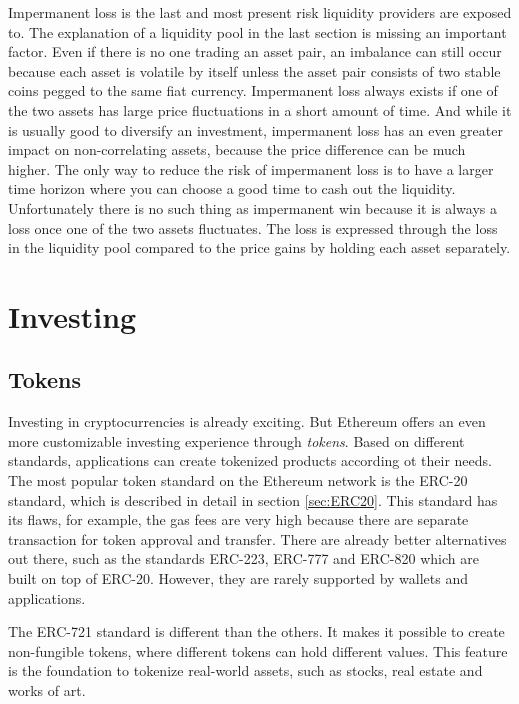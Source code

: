 Impermanent loss is the last and most present risk liquidity providers are exposed to. The explanation of a liquidity pool in the last section is missing an important factor. Even if there is no one trading an asset pair, an imbalance can still occur because each asset is volatile by itself unless the asset pair consists of two stable coins pegged to the same fiat currency. Impermanent loss always exists if one of the two assets has large price fluctuations in a short amount of time. And while it is usually good to diversify an investment, impermanent loss has an even greater impact on non-correlating assets, because the price difference can be much higher. The only way to reduce the risk of impermanent loss is to have a larger time horizon where you can choose a good time to cash out the liquidity. Unfortunately there is no such thing as impermanent win because it is always a loss once one of the two assets fluctuates. The loss is expressed through the loss in the liquidity pool compared to the price gains by holding each asset separately.

\section{Investing}
\subsection{Tokens}
Investing in cryptocurrencies is already exciting. But Ethereum offers an even more customizable investing experience through \textit{tokens}. Based on different standards, applications can create tokenized products according ot their needs. The most popular token standard on the Ethereum network is the ERC-20 standard, which is described in detail in section \ref{sec:ERC20}. This standard has its flaws, for example, the gas fees are very high because there are separate transaction for token approval and transfer. There are already better alternatives out there, such as the standards ERC-223, ERC-777 and ERC-820 which are built on top of ERC-20. However, they are rarely supported by wallets and applications.

The ERC-721 standard is different than the others. It makes it possible to create non-fungible tokens, where different tokens can hold different values. This feature is the foundation to tokenize real-world assets, such as stocks, real estate and works of art.

